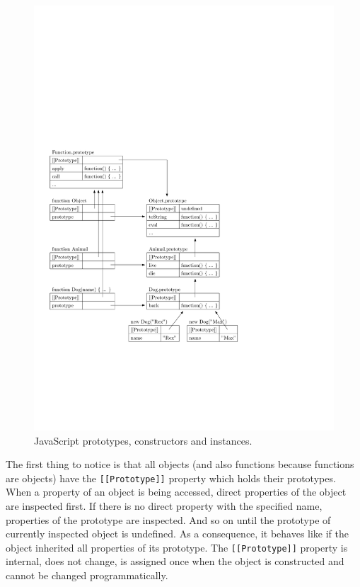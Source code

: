 \documentclass[12pt,a4paper]{report}
\begin{document}
\begin{figure}[ht]
  \centering
	\includegraphics{img/JavaScriptPrototypes.pdf}
	\caption{JavaScript prototypes, constructors and instances.}
	\label{JavaScriptInheritance}
\end{figure}

The first thing to notice is that all objects (and also functions because functions are objects) have the \texttt{[[Prototype]]} property which holds their prototypes. When a property of an object is being accessed, direct properties of the object are inspected first. If there is no direct property with the specified name, properties of the prototype are inspected. And so on until the prototype of currently inspected object is undefined. As a consequence, it behaves like if the object inherited all properties of its prototype. The \texttt{[[Prototype]]} property is internal, does not change, is assigned once when the object is constructed and cannot be changed programmatically.
\end{document}
